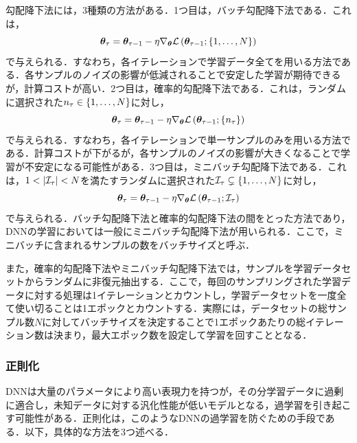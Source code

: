 勾配降下法には，3種類の方法がある\cite{zhang2019gradient}．1つ目は，バッチ勾配降下法である．これは，
\begin{equation}
    \bm{\theta}_{\tau} = \bm{\theta}_{\tau - 1} - \eta \nabla_{\bm{\theta}} \mathcal{L}\left(\bm{\theta}_{\tau - 1}; \left\{1, \ldots, N\right\}\right)
\end{equation}
で与えられる．すなわち，各イテレーションで学習データ全てを用いる方法である．各サンプルのノイズの影響が低減されることで安定した学習が期待できるが，計算コストが高い．2つ目は，確率的勾配降下法である．これは，ランダムに選択された$n_{\tau} \in \left\{1, \ldots, N\right\}$に対し，
\begin{equation}
    \bm{\theta}_{\tau} = \bm{\theta}_{\tau - 1} - \eta \nabla_{\bm{\theta}} \mathcal{L}\left(\bm{\theta}_{\tau - 1}; \left\{n_{\tau}\right\}\right)
\end{equation}
で与えられる．すなわち，各イテレーションで単一サンプルのみを用いる方法である．計算コストが下がるが，各サンプルのノイズの影響が大きくなることで学習が不安定になる可能性がある．3つ目は，ミニバッチ勾配降下法である．これは，$1 < \left|\mathcal{I}_{\tau}\right| < N$を満たすランダムに選択された$\mathcal{I}_{\tau} \subsetneq \left\{1, \ldots, N\right\}$に対し，
\begin{equation}
    \bm{\theta}_{\tau} = \bm{\theta}_{\tau - 1} - \eta \nabla_{\bm{\theta}} \mathcal{L}\left(\bm{\theta}_{\tau - 1}; \mathcal{I}_{\tau}\right)
\end{equation}
で与えられる．バッチ勾配降下法と確率的勾配降下法の間をとった方法であり，DNNの学習においては一般にミニバッチ勾配降下法が用いられる．ここで，ミニバッチに含まれるサンプルの数をバッチサイズと呼ぶ．

また，確率的勾配降下法やミニバッチ勾配降下法では，サンプルを学習データセットからランダムに非復元抽出する．ここで，毎回のサンプリングされた学習データに対する処理は1イテレーションとカウントし，学習データセットを一度全て使い切ることは1エポックとカウントする．実際には，データセットの総サンプル数$N$に対してバッチサイズを決定することで1エポックあたりの総イテレーション数は決まり，最大エポック数を設定して学習を回すこととなる．

\subsubsection{正則化}
DNNは大量のパラメータにより高い表現力を持つが，その分学習データに過剰に適合し，未知データに対する汎化性能が低いモデルとなる，過学習を引き起こす可能性がある．正則化は，このようなDNNの過学習を防ぐための手段である．以下，具体的な方法を3つ述べる．

